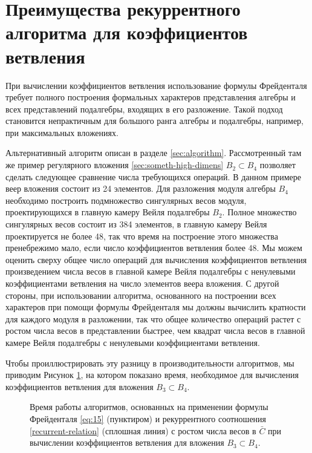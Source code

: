 \section{Преимущества рекуррентного алгоритма для коэффициентов ветвления}
\label{sec:branching-algor-comparison}

При вычислении коэффициентов ветвления использование формулы Фрейденталя требует полного построения формальных характеров представления алгебры и всех представлений подалгебры, входящих в его разложение. Такой подход становится непрактичным для большого ранга алгебры и подалгебры, например, при максимальных вложениях. 

Альтернативный алгоритм описан в разделе \ref{sec:algorithm}. Рассмотренный там же пример регулярного вложения \ref{sec:someth-high-dimens}  $B_{2}\subset B_{4}$ позволяет сделать следующее сравнение числа требующихся операций. В данном примере веер вложения состоит из 24 элементов. Для разложения модуля алгебры  $B_{4}$ необходимо построить подмножество сингулярных весов модуля, проектирующихся в главную камеру Вейля подалгебры $B_{2}$. Полное множество сингулярных весов состоит из 384 элементов, в главную камеру Вейля проектируется не более 48, так что время на построение этого множества пренебрежимо мало, если число коэффициентов ветвления более 48. Мы можем оценить сверху общее число операций для вычисления коэффициентов ветвления произведением числа весов в главной камере Вейля подалгебры с ненулевыми коэффициентами ветвления на число элементов веера вложения. 
С другой стороны, при использовании алгоритма, основанного на построении всех характеров при помощи формулы Фрейденталя мы должны вычислить кратности для каждого модуля в разложении, так что общее количество операций растет с ростом числа весов в представлении быстрее, чем квадрат числа весов в главной камере Вейля подалгебры с ненулевыми коэффициентами ветвления. 

Чтобы проиллюстрировать эту разницу в производительности алгоритмов, мы приводим Рисунок \ref{fig:branching}, на котором показано время, необходимое для вычисления коэффициентов ветвления для вложения $B_{3}\subset B_{4}$.

\begin{figure}[h]
  \noindent{}
  \caption{Время работы алгоритмов, основанных на применении формулы Фрейденталя \eqref{eq:15} (пунктиром)  и рекуррентного соотношения \eqref{recurrent-relation} (сплошная линия) с ростом числа весов в  $\bar C$ при вычислении коэффициентов ветвления для вложения $B_{3}\subset B_{4}$.}
  \label{fig:branching}
\end{figure}

